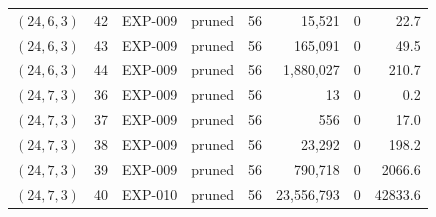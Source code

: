 \begin{longtable}{lrllrrrr}
$(24,6,3)$ & 42 & EXP-009 & pruned & 56 & 15{,}521 & 0 & 22.7 \\
$(24,6,3)$ & 43 & EXP-009 & pruned & 56 & 165{,}091 & 0 & 49.5 \\
$(24,6,3)$ & 44 & EXP-009 & pruned & 56 & 1{,}880{,}027 & 0 & 210.7 \\
$(24,7,3)$ & 36 & EXP-009 & pruned & 56 & 13 & 0 & 0.2 \\
$(24,7,3)$ & 37 & EXP-009 & pruned & 56 & 556 & 0 & 17.0 \\
$(24,7,3)$ & 38 & EXP-009 & pruned & 56 & 23{,}292 & 0 & 198.2 \\
$(24,7,3)$ & 39 & EXP-009 & pruned & 56 & 790{,}718 & 0 & 2066.6 \\
$(24,7,3)$ & 40 & EXP-010 & pruned & 56 & 23{,}556{,}793 & 0 & 42833.6 \\
\bottomrule
\end{longtable}

